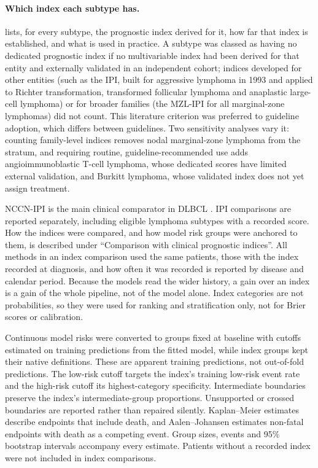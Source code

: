 \paragraph{Which index each subtype has.}  lists,
for every subtype, the prognostic index derived for it, how far that index is
established, and what is used in practice. A subtype was classed as having no
dedicated prognostic index if no multivariable index had been derived for that
entity and externally validated in an independent cohort; indices developed for
other entities (such as the IPI, built for aggressive lymphoma in 1993 and
applied to Richter transformation, transformed follicular lymphoma and
anaplastic large-cell lymphoma) or for broader families (the MZL-IPI for all
marginal-zone lymphomas) did not count. This literature criterion was preferred
to guideline adoption, which differs between guidelines. Two sensitivity
analyses vary it: counting family-level indices removes nodal marginal-zone
lymphoma from the stratum, and requiring routine, guideline-recommended use adds
angioimmunoblastic T-cell lymphoma, whose dedicated scores have limited external
validation, and Burkitt lymphoma, whose validated index does not yet assign
treatment.



NCCN-IPI is the main clinical comparator in DLBCL
\citep{zhou2014nccnipi}. IPI comparisons are reported separately, including
eligible lymphoma subtypes with a recorded score. How the indices were compared, and
how model risk groups were anchored to them, is described under ``Comparison
with clinical prognostic indices''. All methods in an index comparison used the
same patients, those with the index recorded at diagnosis, and how often it was
recorded is reported by disease and calendar period. Because the models read
the wider history, a gain over an index is a gain of the whole pipeline, not of
the model alone. Index categories are not probabilities, so they were used for
ranking and stratification only, not for Brier scores or calibration.

Continuous model risks were converted to groups fixed at baseline with cutoffs
estimated on training predictions from the fitted model, while index groups
kept their native definitions. These are apparent training predictions, not
out-of-fold predictions. The low-risk cutoff targets the index's training
low-risk event rate and the high-risk cutoff its highest-category specificity.
Intermediate boundaries preserve the index's intermediate-group proportions.
Unsupported or crossed boundaries are reported rather than repaired silently.
Kaplan--Meier estimates describe endpoints that include death, and
Aalen--Johansen estimates non-fatal endpoints with death as a competing event.
Group sizes, events and 95\% bootstrap intervals accompany every estimate.
Patients without a recorded index were not included in index comparisons.

